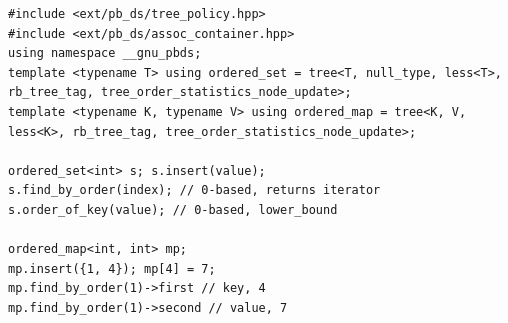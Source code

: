 \begin{verbatim}
#include <ext/pb_ds/tree_policy.hpp>
#include <ext/pb_ds/assoc_container.hpp>
using namespace __gnu_pbds;
template <typename T> using ordered_set = tree<T, null_type, less<T>, rb_tree_tag, tree_order_statistics_node_update>;
template <typename K, typename V> using ordered_map = tree<K, V, less<K>, rb_tree_tag, tree_order_statistics_node_update>;

ordered_set<int> s; s.insert(value);
s.find_by_order(index); // 0-based, returns iterator
s.order_of_key(value); // 0-based, lower_bound

ordered_map<int, int> mp;
mp.insert({1, 4}); mp[4] = 7;
mp.find_by_order(1)->first // key, 4
mp.find_by_order(1)->second // value, 7
\end{verbatim}